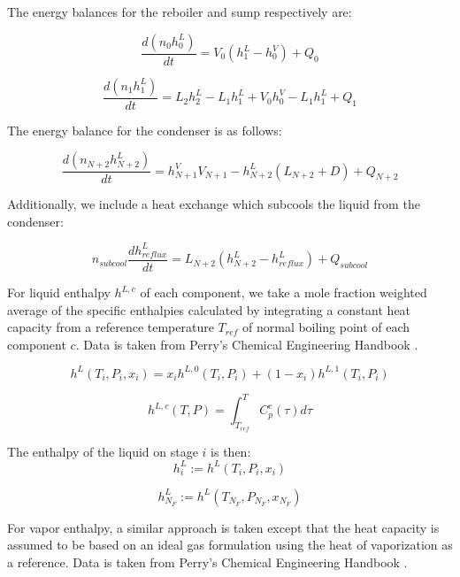  The energy balances for the reboiler and sump respectively are:

\begin{equation}
    \frac{d(n_0h^L_0)}{dt} = V_0(h^L_{1} - h^V_0) + Q_0
\end{equation}

\begin{equation}
    \frac{d(n_1h^L_1)}{dt} = L_2 h^L_2 - L_1 h^L_1 + V_0 h^V_0 - L_1 h^L_1 + Q_1  
\end{equation}

The energy balance for the condenser is as follows:

\begin{equation}
    \frac{d(n_{N+2}h^L_{N+2})}{dt} = h^V_{N+1} V_{N+1}-h^L_{N+2}(L_{N+2} + D) + Q_{N+2}
\end{equation}

Additionally, we include a heat exchange which subcools the liquid from the condenser:

\begin{equation}
    n_{subcool}\frac{d h^L_{reflux}}{dt} = L_{N+2}(h^L_{N+2} - h^L_{reflux}) + Q_{subcool}
\end{equation}

For liquid enthalpy $h^{L,c}$ of each component, we take a mole fraction weighted average of the specific enthalpies calculated by integrating a constant heat capacity from a reference temperature $T_{ref}$ of normal boiling point of each component $c$. Data is taken from Perry’s Chemical Engineering Handbook \cite{Perrys2018}.

\begin{equation}
    h^L(T_i, P_i, x_i) = x_ih^{L,0}(T_i,P_i) + (1-x_i)h^{L,1}(T_i,P_i)
\end{equation}

\begin{equation}
    h^{L,c}(T,P) = \int_{T_{ref}}^T C_p^c(\tau)d\tau 
\end{equation}

The enthalpy of the liquid on stage $i$ is then:
\begin{equation}
    h^L_i := h^L(T_i, P_i,x_i)
\end{equation}

\begin{equation}
    h^L_{N_F} := h^L(T_{N_F}, P_{N_F},x_{N_F})
\end{equation}

For vapor enthalpy,  a similar approach is taken except that the heat capacity is assumed to be based on an ideal gas formulation using the heat of vaporization as a reference. Data is taken from Perry’s Chemical Engineering Handbook \cite{Perrys2018}.

